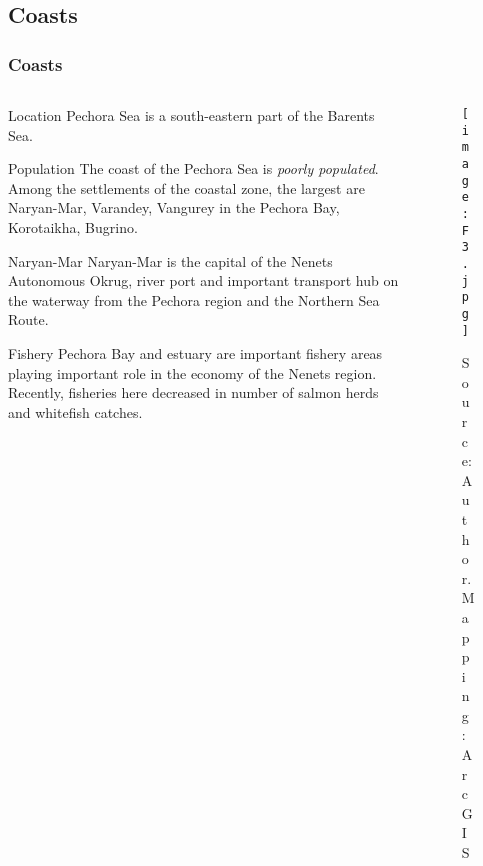 \documentclass[pdflatex,compress,8pt,
	xcolor={dvipsnames,dvipsnames,svgnames,x11names,table},
	hyperref={	
	breaklinks = true, 
	pdfauthor={Lemenkova Polina}, 
	pdfsubject={Presentation}, 
	pdfcreator={Lemenkova Polina}, 
	pdfproducer={Lemenkova Polina}, 
	colorlinks=true,
	linkcolor=NavyBlue, 
	citecolor=NavyBlue, 
	urlcolor = NavyBlue, 
	breaklinks = true}]{beamer}
\begin{document}
\subsection{Coasts}
\begin{frame}\frametitle{Coasts}

\begin{minipage}[0.4\textheight]{\textwidth}
\begin{columns}[T]
\begin{column}{0.5\textwidth}

	\begin{block}{Location}
Pechora Sea is a south-eastern part of the Barents Sea.
	\end{block}
	
	\begin{alertblock}{Population}
The coast of the Pechora Sea is \emph{poorly populated}. Among the settlements of the coastal zone, the largest are Naryan-Mar, Varandey, Vangurey in the Pechora Bay, Korotaikha, Bugrino.
	\end{alertblock}
	
	\begin{block}{Naryan-Mar}
Naryan-Mar is the capital of the Nenets Autonomous Okrug, river port and important transport hub on the waterway from the Pechora region and the Northern Sea Route.
	\end{block}

	\begin{block}{Fishery}
Pechora Bay and estuary are important fishery areas playing important role in the economy of the Nenets region. Recently, fisheries here decreased in number of salmon herds and whitefish catches.
	\end{block}
	
\end{column}
\begin{column}{0.5\textwidth}
\vspace{3em}
\begin{figure}[H]
	\centering
		\texttt{[image: F3.jpg]}\caption{Source: Author. Mapping: ArcGIS}
\end{figure}
\end{column}
\end{columns}
\end{minipage}

\end{frame}
\end{document}
